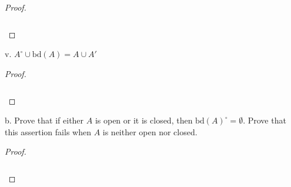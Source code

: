 \begin{proof}\renewcommand{\qedsymbol}{}\ \\\\
    \begin{align*}
    \end{align*}
\end{proof}

\pagebreak


v. $A^{\circ} \cup \text{bd}(A) = A \cup A'$ \ \\
    
\begin{proof}\renewcommand{\qedsymbol}{}\ \\\\
    \begin{align*}
    \end{align*}
\end{proof}

\pagebreak

b. Prove that if either $A$ is open or it is closed, then $\text{bd}(A)^{\circ} = \emptyset$. Prove that this assertion
   fails when $A$ is neither open nor closed. \ \\
    
\begin{proof}\renewcommand{\qedsymbol}{}\ \\\\
    \begin{align*}
    \end{align*}
\end{proof}

\pagebreak